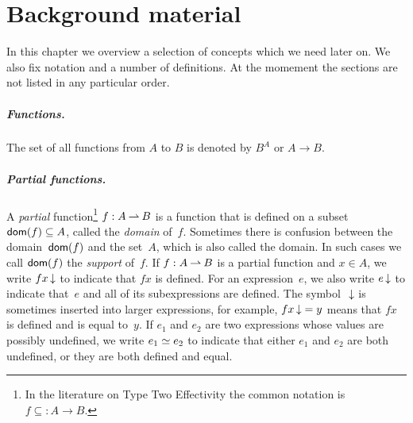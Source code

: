\chapter{Background material}
\label{chap:background-material}

In this chapter we overview a selection of concepts which we need
later on. We also fix notation and a number of definitions. At the
momement the sections are not listed in any particular order.

\paragraph{Functions.}

The set of all functions from $A$ to $B$ is denoted by $B^A$ or $A \to B$.

\paragraph{Partial functions.}

A \emph{partial} function\footnote{In the literature on Type Two
  Effectivity the common notation is $f \subseteq {:} A \to B$.} $f:
A \mathbin{\rightharpoonup} B$ is a function that is defined on a subset $\mathsf{dom}(f)
\subseteq A$, called the \emph{domain} of~$f$. Sometimes there is
confusion between the domain~$\mathsf{dom}(f)$ and the set~$A$, which is also
called the domain. In such cases we call $\mathsf{dom}(f)$ the \emph{support}
of~$f$. If $f: A \mathbin{\rightharpoonup} B$ is a partial function and $x \in A$, we
write $f x \,{\downarrow}$ to indicate that $f x$ is defined. For an
expression~$e$, we also write $e \,{\downarrow}$ to indicate that~$e$ and
all of its subexpressions are defined. The symbol~$\,{\downarrow}$ is
sometimes inserted into larger expressions, for example, $f x \,{\downarrow}
= y$ means that $f x$ is defined and is equal to~$y$. If $e_1$ and
$e_2$ are two expressions whose values are possibly undefined, we
write $e_1 \simeq e_2$ to indicate that either $e_1$ and $e_2$ are both
undefined, or they are both defined and equal.




